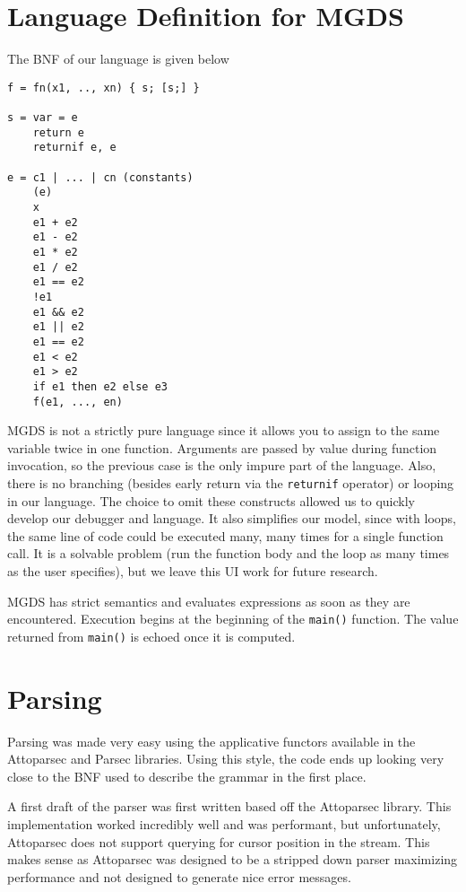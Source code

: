 \documentclass[letterpaper, 10pt]{article}
\newcommand{\ttt}{\texttt}
\begin{document}
\section{Language Definition for MGDS}
The BNF of our language is given below
\begin{verbatim}
f = fn(x1, .., xn) { s; [s;] }

s = var = e
    return e
    returnif e, e

e = c1 | ... | cn (constants)
    (e)
    x
    e1 + e2
    e1 - e2
    e1 * e2
    e1 / e2
    e1 == e2
    !e1
    e1 && e2
    e1 || e2
    e1 == e2
    e1 < e2
    e1 > e2
    if e1 then e2 else e3
    f(e1, ..., en)
\end{verbatim}
MGDS is not a strictly pure language since it allows you to assign to the
same variable twice in one function. Arguments are passed by value during
function invocation, so the previous case is the only impure part of the
language. Also, there is no branching (besides early return via the
\ttt{returnif} operator) or looping in our language. The choice to omit
these constructs allowed us to quickly develop our debugger and
language. It also simplifies our model, since with loops, the same line of
code could be executed many, many times for a single function call. It is
a solvable problem (run the function body and the loop as many times as
the user specifies), but we leave this UI work for future research.

MGDS has strict semantics and evaluates expressions as soon as they are
encountered. Execution begins at the beginning of the \ttt{main()}
function. The value returned from \ttt{main()} is echoed once it is
computed. 

\section{Parsing}
Parsing was made very easy using the applicative functors available in the
Attoparsec and Parsec libraries. Using this style, the code ends up
looking very close to the BNF used to describe the grammar in the
first place.

A first draft of the parser was first written based off the Attoparsec
library. This implementation worked incredibly well and was performant,
but unfortunately, Attoparsec does not support querying for cursor
position in the stream. This makes sense as Attoparsec was designed to be
a stripped down parser maximizing performance and not designed to generate
nice error messages.
\end{document}
